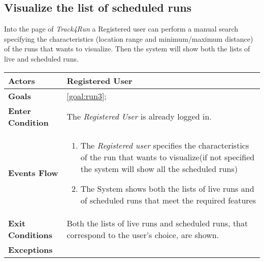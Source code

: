  \subsection{Visualize the list of scheduled runs}
Into the page of \emph{Track4Run} a Registered user can perform a manual search specifying the characteristics (location range and minimum/maximum distance) of the runs that wants to visualize. Then the system will show both the lists of live and scheduled runs. 

\begin{table}[H]
	\centering
    
    \begin{tabular}{|p{3.5cm}|p{10.3cm}|}
    
    \hline
    \textbf{\large{Actors}}  			& \tabitem Registered User 	\\
    				 					
    \hline
    \textbf{\large{Goals}} 				& \ref{goal:run3};\\
    
    \hline
    \textbf{\large{Enter Condition}}	& The \emph{Registered User} is already logged in.		\\
    
    \hline
    \textbf{\large{Events Flow}}		& \begin{enumerate}[leftmargin=0.5cm]
                                          	\item The \emph{Registered user} specifies the characteristics of the run that wants to visualize(if not specified the system will show all the scheduled runs)  
                                          	 \item The System shows both the lists of live runs and of scheduled runs that meet the required features
                                          \end{enumerate}
    										\\
    \hline
    \textbf{\large{Exit Conditions}}    & Both the lists of live runs and scheduled runs, that correspond to the user's choice, are shown.  \\
    
    \hline
    \textbf{\large{Exceptions}} 		& \\
    
    \hline
    
    
    \end{tabular}
	
\end{table}
